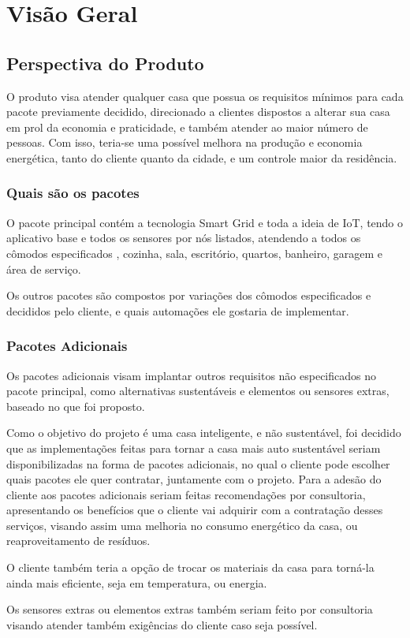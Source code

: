\chapter{Visão Geral}
    \section{Perspectiva do Produto}
        \par O produto visa atender qualquer casa que possua os requisitos mínimos para cada pacote previamente decidido, direcionado a clientes dispostos a alterar sua casa em prol da economia e praticidade, e também atender ao maior número de pessoas. Com isso, teria-se uma  possível melhora na produção e economia energética, tanto do cliente quanto da cidade, e um controle maior da residência.

        \subsection{Quais são os pacotes}
            \par O pacote principal contém a tecnologia Smart Grid e toda a ideia de IoT, tendo o aplicativo base e todos os sensores por nós listados, atendendo a todos os cômodos especificados , cozinha, sala, escritório, quartos, banheiro, garagem e área de serviço.
	        \par Os outros pacotes são compostos por variações dos cômodos especificados e decididos pelo cliente, e quais automações ele gostaria de implementar.

        \subsection{Pacotes Adicionais}
            \par Os pacotes adicionais visam implantar outros requisitos não especificados no pacote principal, como alternativas sustentáveis e elementos ou sensores extras, baseado no que foi proposto.
	        \par Como o objetivo do projeto é uma casa inteligente, e não sustentável, foi decidido que as implementações feitas para tornar a casa mais auto sustentável seriam disponibilizadas na forma de pacotes adicionais, no qual o cliente pode escolher quais pacotes ele quer contratar, juntamente com o projeto. Para a adesão do cliente aos pacotes adicionais seriam feitas recomendações por consultoria, apresentando os benefícios que o cliente vai adquirir com a contratação desses serviços, visando assim uma melhoria no consumo energético da casa, ou reaproveitamento de resíduos.
            \par O cliente também teria a opção de trocar os materiais da casa para torná-la ainda mais eficiente, seja em temperatura, ou energia.
            \par Os sensores extras ou elementos extras também seriam feito por consultoria visando atender também exigências do cliente caso seja possível.

